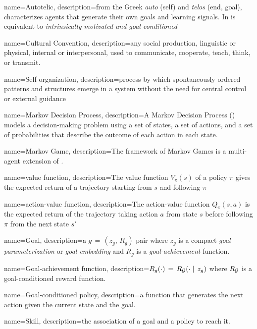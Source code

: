 \makeglossaries

{
    name=Autotelic,
    description={from the Greek \textit{auto} (self) and \textit{telos} (end, goal), characterizes agents that generate their own goals and learning signals. In is equivalent to \textit{intrinsically motivated and goal-conditioned}}
}

{
	name=Cultural Convention,
	description={any social production, linguistic or physical, internal or interpersonal, used to communicate, cooperate, teach, think, or transmit.}
}

{
	name=Self-organization,
	description={process by which spontaneously ordered patterns and structures emerge in a system without the need for central control or external guidance}
}

{
	name=Markov Decision Process,
	description={A Markov Decision Process (\mdp) models a decision-making problem using a set of states, a set of actions, and a set of probabilities that describe the outcome of each action in each state.}
}

{
	name=Markov Game,
	description={The framework of Markov Games is a multi-agent extension of \mdps.}
}

{
	name=value function,
	description={The value function $V_\pi(s)$ of a policy $\pi$ gives the expected return of a trajectory starting from $s$ and following $\pi$}
}

{
	name=action-value function,
	description={The action-value function $Q_\pi(s,a)$ is the expected return of the trajectory taking action $a$ from state $s$ before following $\pi$ from the next state $s'$}
}

{
	name=Goal,
	description={a $g\,=\,(z_g,\,R_g)$ pair where $z_g$ is a compact \textit{goal parameterization} or \textit{goal embedding} and $R_g$ is a \textit{goal-achievement} function.}
}

{
	name=Goal-achievement function,
	description={$R_g(\cdot)\,=\,R_{\mathcal{G}}(\cdot\mid\,z_g)$} where $R_{\mathcal{G}}$ is a goal-conditioned reward function.
}


{
	name=Goal-conditioned policy,
	description={a function that generates the next action given the current state and the goal.}
}

{
	name=Skill,
	description={the association of a goal and a policy to reach it.}
}


